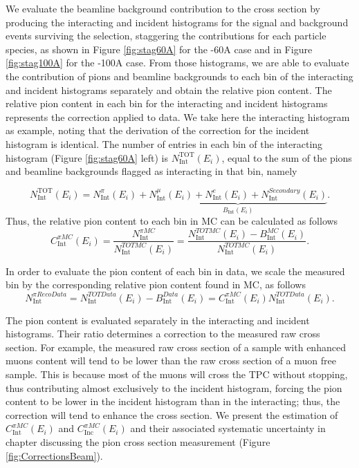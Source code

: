 We evaluate the beamline background contribution to the cross section by producing the interacting and incident histograms for the signal and background events surviving the selection, staggering the contributions for each particle species, as shown in Figure  \ref{fig:stag60A} for the -60A case and  in Figure \ref{fig:stag100A} for the -100A case. From those histograms, we are able to evaluate the contribution of  pions and  beamline backgrounds to each bin of the interacting and incident histograms separately and obtain the relative pion content. The relative pion content in each bin for the interacting and incident histograms represents the correction applied to data. We take here the interacting histogram as example, noting that the derivation of the correction for the incident histogram is identical. The number of entries in each bin of the interacting histogram (Figure \ref{fig:stag60A} left) is  $N^{\text{TOT}}_{\text{Int}} (E_{i})$, equal to the sum of the pions and beamline backgrounds flagged as interacting in that bin, namely

\begin{equation}
N^{\text{TOT}}_{\text{Int}} (E_{i}) =  N^\pi_{\text{Int}} (E_{i}) + \underbrace{ N^\mu_{\text{Int}} (E_{i}) + N^e_{\text{Int}} (E_{i}) + N^{Secondary}_{\text{Int}} (E_{i}) }_{B_{\text{Int}} (E_i)}.
\end{equation}
Thus, the relative pion content to each bin in MC can be calculated as follows
\begin{equation}
C^{\pi MC}_{\text{Int}} (E_{i}) =  \frac{N^{\pi MC}_{\text{Int}}}{ N^{TOT MC}_{\text{Int}} (E_{i}) } =    \frac{N^{TOT MC}_{\text{Int}} (E_{i}) - B^ {MC}_{\text{Int}} (E_i)}{ N^{TOT MC}_{\text{Int}} (E_{i})}.
\end{equation}


In order to evaluate the pion content of each bin in data, we scale the measured bin by the corresponding relative pion content found in MC, as follows
\begin{equation}
N^{\pi Reco Data}_{\text{Int}} = N^{TOT Data}_{\text{Int}} (E_{i}) - B^{Data}_{\text{Int}} (E_i)  =  C^{\pi MC}_{\text{Int}} (E_{i}) N^{TOT Data}_{\text{Int}} (E_{i}).
\end{equation}

The pion content is evaluated separately in the interacting and incident histograms. Their ratio determines a correction to the measured raw cross section. 
For example, the measured raw  cross section of a sample with enhanced muons content will tend to be lower than the raw cross section of a muon free sample. This is because most of the muons will cross the TPC without stopping, thus contributing almost exclusively to the incident histogram, forcing the pion content to be lower in the incident histogram than in the interacting; thus, the correction will tend to enhance the cross section. We present the estimation of $C^{\pi MC}_{\text{Int}} (E_{i})$ and $C^{\pi MC}_{\text{Inc}} (E_{i})$ and their associated systematic uncertainty in chapter discussing the pion cross section measurement (Figure \ref{fig:CorrectionsBeam}).


